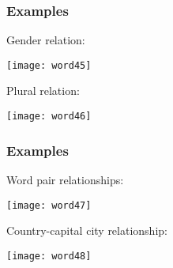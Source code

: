 \begin{frame}[fragile]\frametitle{Examples}
Gender relation:
\begin{center}
\texttt{[image: word45]}
\end{center}
Plural relation:

\begin{center}
\texttt{[image: word46]}
\end{center}

\end{frame}


\begin{frame}[fragile]\frametitle{Examples}
Word pair relationships:
\begin{center}
\texttt{[image: word47]}
\end{center}
Country-capital city relationship:

\begin{center}
\texttt{[image: word48]}
\end{center}

\end{frame}




